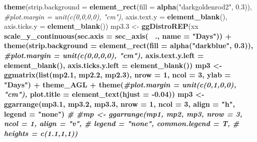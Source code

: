 \documentclass[
]{article}
\newenvironment{Shaded}{\begin{snugshade}}{\end{snugshade}}
\newcommand{\CommentTok}[1]{\textcolor[rgb]{0.56,0.35,0.01}{\textit{#1}}}
\newcommand{\DataTypeTok}[1]{\textcolor[rgb]{0.13,0.29,0.53}{#1}}
\newcommand{\DecValTok}[1]{\textcolor[rgb]{0.00,0.00,0.81}{#1}}
\newcommand{\FloatTok}[1]{\textcolor[rgb]{0.00,0.00,0.81}{#1}}
\newcommand{\KeywordTok}[1]{\textcolor[rgb]{0.13,0.29,0.53}{\textbf{#1}}}
\newcommand{\NormalTok}[1]{#1}
\newcommand{\OperatorTok}[1]{\textcolor[rgb]{0.81,0.36,0.00}{\textbf{#1}}}
\newcommand{\StringTok}[1]{\textcolor[rgb]{0.31,0.60,0.02}{#1}}
\begin{document}
\begin{Shaded}
\begin{Highlighting}[]
{{{{{{{{{{{{{{{{\StringTok{  }\KeywordTok{theme}\NormalTok{(}\DataTypeTok{strip.background =} \KeywordTok{element_rect}\NormalTok{(}\DataTypeTok{fill =} \KeywordTok{alpha}\NormalTok{(}\StringTok{"darkgoldenrod2"}\NormalTok{, }\FloatTok{0.3}\NormalTok{)),}
        \CommentTok{#plot.margin = unit(c(0,0,0,0), "cm"),}
        \DataTypeTok{axis.text.y =} \KeywordTok{element_blank}\NormalTok{(), }
        \DataTypeTok{axis.ticks.y =} \KeywordTok{element_blank}\NormalTok{())}
\NormalTok{mp3}\FloatTok{.3}\NormalTok{ <-}\StringTok{ }\KeywordTok{ggDistroREP}\NormalTok{(xx }\OperatorTok{%
\StringTok{  }\KeywordTok{scale_y_continuous}\NormalTok{(}\DataTypeTok{sec.axis =} \KeywordTok{sec_axis}\NormalTok{(}\OperatorTok{~}\StringTok{ }\NormalTok{., }\DataTypeTok{name =} \StringTok{"Days"}\NormalTok{)) }\OperatorTok{+}
\StringTok{  }\KeywordTok{theme}\NormalTok{(}\DataTypeTok{strip.background =} \KeywordTok{element_rect}\NormalTok{(}\DataTypeTok{fill =} \KeywordTok{alpha}\NormalTok{(}\StringTok{"darkblue"}\NormalTok{, }\FloatTok{0.3}\NormalTok{)),}
        \CommentTok{#plot.margin = unit(c(0,0,0,0), "cm"),}
        \DataTypeTok{axis.text.y.left =} \KeywordTok{element_blank}\NormalTok{(),}
        \DataTypeTok{axis.ticks.y.left =} \KeywordTok{element_blank}\NormalTok{())}
\NormalTok{mp3 <-}\StringTok{ }\KeywordTok{ggmatrix}\NormalTok{(}\KeywordTok{list}\NormalTok{(mp2}\FloatTok{.1}\NormalTok{, mp2}\FloatTok{.2}\NormalTok{, mp2}\FloatTok{.3}\NormalTok{), }
                \DataTypeTok{nrow =} \DecValTok{1}\NormalTok{, }\DataTypeTok{ncol =} \DecValTok{3}\NormalTok{, }\DataTypeTok{ylab =} \StringTok{"Days"}\NormalTok{) }\OperatorTok{+}
\StringTok{  }\NormalTok{theme_AGL }\OperatorTok{+}
\StringTok{  }\KeywordTok{theme}\NormalTok{(}\CommentTok{#plot.margin = unit(c(0,1,0,0), "cm"),}
        \DataTypeTok{plot.title =} \KeywordTok{element_text}\NormalTok{(}\DataTypeTok{hjust =} \FloatTok{-0.04}\NormalTok{))}
\NormalTok{mp3 <-}\StringTok{ }\KeywordTok{ggarrange}\NormalTok{(mp3}\FloatTok{.1}\NormalTok{, mp3}\FloatTok{.2}\NormalTok{, mp3}\FloatTok{.3}\NormalTok{, }\DataTypeTok{nrow =} \DecValTok{1}\NormalTok{, }\DataTypeTok{ncol =} \DecValTok{3}\NormalTok{, }\DataTypeTok{align =} \StringTok{"h"}\NormalTok{, }\DataTypeTok{legend =} \StringTok{"none"}\NormalTok{)}
\CommentTok{#}
\CommentTok{#mp <- ggarrange(mp1, mp2, mp3, nrow = 3, ncol = 1, align = "v",}
\CommentTok{#                 legend = "none", common.legend = T, }
\CommentTok{#                 heights = c(1.1,1,1))}
}}}}}}}}}}}}}}}}}
\end{Highlighting}
\end{Shaded}
\end{document}
